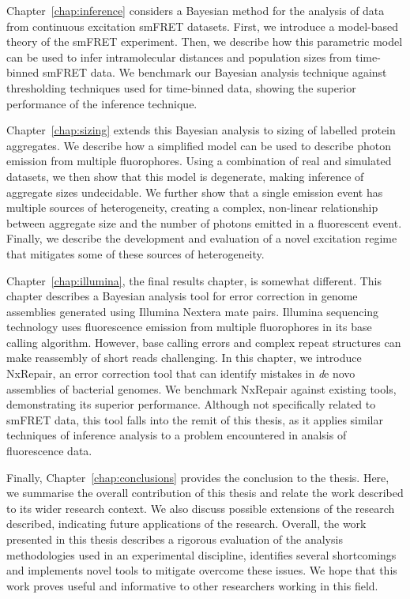 Chapter~\ref{chap:inference} considers a Bayesian method for the analysis of data from continuous excitation smFRET datasets. First, we introduce a model-based theory of the smFRET experiment. Then, we describe how this parametric model can be used to infer intramolecular distances and population sizes from time-binned smFRET data. We benchmark our Bayesian analysis technique against thresholding techniques used for time-binned data, showing the superior performance of the inference technique.

Chapter~\ref{chap:sizing} extends this Bayesian analysis to sizing of labelled protein aggregates. We describe how a simplified model can be used to describe photon emission from multiple fluorophores. Using a combination of real and simulated datasets, we then show that this model is degenerate, making inference of aggregate sizes undecidable. We further show that a single emission event has multiple sources of heterogeneity, creating a complex, non-linear relationship between aggregate size and the number of photons emitted in a fluorescent event. Finally, we describe the development and evaluation of a novel excitation regime that mitigates some of these sources of heterogeneity.

Chapter~\ref{chap:illumina}, the final results chapter, is somewhat different. This chapter describes a Bayesian analysis tool for error correction in genome assemblies generated using Illumina Nextera mate pairs. Illumina sequencing technology uses fluorescence emission from multiple fluorophores in its base calling algorithm. However, base calling errors and complex repeat structures can make reassembly of short reads challenging. In this chapter, we introduce NxRepair, an error correction tool that can identify mistakes in {\emph de novo} assemblies of bacterial genomes. We benchmark NxRepair against existing tools, demonstrating its superior performance. Although not specifically related to smFRET data, this tool falls into the remit of this thesis, as it applies similar techniques of inference analysis to a problem encountered in analsis of fluorescence data.

Finally, Chapter~\ref{chap:conclusions} provides the conclusion to the thesis. Here, we summarise the overall contribution of this thesis and relate the work described to its wider research context. We also discuss possible extensions of the research described, indicating future applications of the research. Overall, the work presented in this thesis describes a rigorous evaluation of the analysis methodologies used in an experimental discipline, identifies several shortcomings and implements novel tools to mitigate overcome these issues. We hope that this work proves useful and informative to other researchers working in this field.


